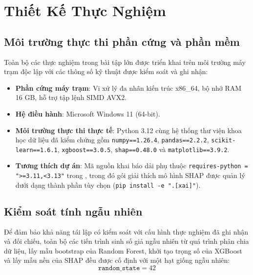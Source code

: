 
\chapter{Thiết Kế Thực Nghiệm}
\label{chap:thiet_ke}

\section{Môi trường thực thi phần cứng và phần mềm}

Toàn bộ các thực nghiệm trong bài tập lớn được triển khai trên môi trường máy trạm độc lập với các thông số kỹ thuật được kiểm soát và ghi nhận:
\begin{itemize}
    \item \textbf{Phần cứng máy trạm}: Vi xử lý đa nhân kiến trúc x86\_64, bộ nhớ RAM 16 GB, hỗ trợ tập lệnh SIMD AVX2.
    \item \textbf{Hệ điều hành}: Microsoft Windows 11 (64-bit).
    \item \textbf{Môi trường thực thi thực tế}: Python 3.12 cùng hệ thống thư viện khoa học dữ liệu đã kiểm chứng gồm \texttt{numpy==1.26.4}, \texttt{pandas==2.2.2}, \texttt{scikit-learn==1.6.1}, \texttt{xgboost==3.0.5}, \texttt{shap==0.48.0} và \texttt{matplotlib==3.9.2}.
    \item \textbf{Tương thích dự án}: Mã nguồn khai báo dải phụ thuộc \texttt{requires-python = ">=3.11,<3.13"} trong , trong đó gói giải thích mô hình SHAP được quản lý dưới dạng thành phần tùy chọn (\texttt{pip install -e ".[xai]"}).
\end{itemize}

\section{Kiểm soát tính ngẫu nhiên}

Để đảm bảo khả năng tái lập có kiểm soát với cấu hình thực nghiệm đã ghi nhận và đối chiếu, toàn bộ các tiến trình sinh số giả ngẫu nhiên từ quá trình phân chia dữ liệu, lấy mẫu bootstrap của Random Forest, khởi tạo trọng số của XGBoost và lấy mẫu nền của SHAP đều được cố định với một hạt giống ngẫu nhiên:
\begin{equation}
    \texttt{random\_state} = 42
\end{equation}

